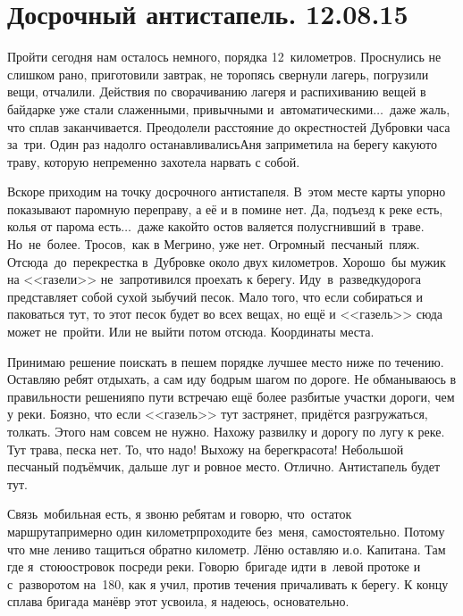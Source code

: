 \chapter{Досрочный антистапель. 12.08.15}
\vepsianrose

Пройти сегодня нам осталось немного, порядка 12~километров. Проснулись не слишком рано, приготовили завтрак, не торопясь свернули лагерь, погрузили вещи, отчалили. Действия по сворачиванию лагеря и распихиванию вещей в байдарке уже стали слаженными, привычными и~автоматическими$\ldots$~даже жаль, что сплав заканчивается. Преодолели расстояние до окрестностей Дубровки часа за~три. Один раз надолго останавливались\mdash Аня заприметила на берегу какую\sdash то траву, которую непременно захотела нарвать с собой. 

Вскоре приходим на точку досрочного антистапеля. В~этом месте карты упорно показывают паромную переправу, а её и в помине нет. Да, подъезд к реке есть, колья от парома есть$\ldots$~даже какой\sdash то остов валяется полусгнивший в~траве. Но~не~более. Тросов,~как в Мегрино, уже нет. Огромный~песчаный~пляж. Отсюда~до~перекрестка в~Дубровке около двух километров. Хорошо~бы мужик на <<газели>> не~запротивился проехать к берегу. Иду~в~разведку\mdash дорога представляет собой сухой зыбучий песок. Мало того, что если собираться и паковаться тут, то этот песок будет во всех вещах, но ещё и <<газель>> сюда может не~пройти. Или не выйти потом отсюда. Координаты места\mdash \CoordsChagodoschaZagrivieParom.

Принимаю решение поискать в пешем порядке лучшее место ниже по течению. Оставляю ребят отдыхать, а сам иду бодрым шагом по дороге. Не обманываюсь в правильности решения\mdash по пути встречаю ещё более разбитые участки дороги, чем у реки. Боязно, что если <<газель>> тут застрянет, придётся разгружаться, толкать. Этого нам совсем не нужно. Нахожу развилку и дорогу по лугу к реке. Тут трава, песка нет. То, что надо! Выхожу на берег\mdash красота! Небольшой песчаный подъёмчик, дальше луг и ровное место. Отлично. Антистапель будет тут\mdash \CoordsChagodoschaFifteenAntistapel. 

Связь~мобильная есть, я звоню ребятам и говорю, что~остаток маршрута\mdash примерно один километр\mdash проходите без~меня, самостоятельно. Потому что мне лениво тащиться обратно километр. Лёню оставляю и.о. Капитана. Там где я~стою\mdash островок посреди реки. Говорю~бригаде идти в~левой протоке и с~разворотом на~180\degree, как я учил, против течения причаливать к берегу. К концу сплава бригада манёвр этот усвоила, я надеюсь, основательно. 

